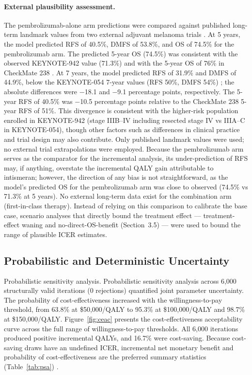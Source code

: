 \documentclass[12pt,a4paper]{article}
\begin{document}
\paragraph{External plausibility assessment.} The \mbox{pembrolizumab}-alone arm predictions were compared against published long-term landmark values from two external adjuvant melanoma trials \cite{eggermont2025,ascierto2025}. At 5 years, the model predicted RFS of 40.5\%, DMFS of 53.8\%, and OS of 74.5\% for the \mbox{pembrolizumab} arm. The predicted 5-year OS (74.5\%) was consistent with the observed \mbox{KEYNOTE-942} value (71.3\%) and with the 5-year OS of 76\% in CheckMate 238 \cite{ascierto2023}. At 7 years, the model predicted RFS of 31.9\% and DMFS of 44.9\%, below the KEYNOTE-054 7-year values (RFS 50\%, DMFS 54\%) \cite{eggermont2025}; the absolute differences were $-$18.1 and $-$9.1 percentage points, respectively. The 5-year RFS of 40.5\% was $-$10.5 percentage points relative to the CheckMate 238 5-year RFS of 51\%. This divergence is consistent with the higher-risk population enrolled in \mbox{KEYNOTE-942} (stage IIIB--IV including resected stage IV vs IIIA--C in KEYNOTE-054), though other factors such as differences in clinical practice and trial design may also contribute. Only published landmark values were used; no external trial extrapolations were employed. Because the \mbox{pembrolizumab} arm serves as the comparator for the incremental analysis, its under-prediction of RFS may, if anything, overstate the incremental QALY gain attributable to intismeran; however, the direction of any bias is not straightforward, as the model's predicted OS for the \mbox{pembrolizumab} arm was close to observed (74.5\% vs 71.3\% at 5 years). No external long-term data exist for the combination arm (first-in-class therapy). Instead of relying on this comparison to calibrate the base case, scenario analyses that directly bound the treatment effect --- treatment-effect waning and no-direct-OS-benefit (Section~3.5) --- were used to bound the range of plausible ICER estimates.



\subsection{Probabilistic and Deterministic Uncertainty}

Probabilistic sensitivity analysis. Probabilistic sensitivity analysis across 6,000 structurally valid iterations (0 rejections) quantified joint parameter uncertainty. The probability of cost-effectiveness increased with the willingness-to-pay threshold, from 63.8\% at \$50,000/QALY to 95.3\% at \$100,000/QALY and 98.7\% at \$150,000/QALY. Figure~\ref{fig:ceac} presents the cost-effectiveness acceptability curve across the full range of willingness-to-pay thresholds. All 6,000 iterations produced positive incremental QALYs, and 16.7\% were cost-saving. Because cost-saving draws have an undefined ICER, incremental net monetary benefit and probability of cost-effectiveness are the preferred summary statistics (Table~\ref{tab:psa}) \cite{stinnett1998}.
\end{document}
